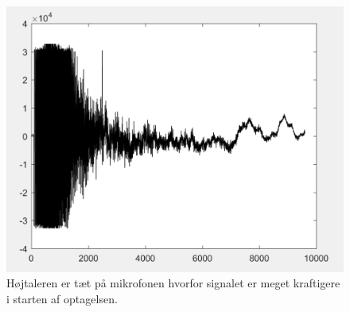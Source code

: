 \documentclass[danish]{article}
\begin{document}
\begin{figure}[H]
	\centering
	\includegraphics[width=0.54\linewidth]{graphics/case4_opg3}
	\caption{Højtaleren er tæt på mikrofonen hvorfor signalet er meget kraftigere i starten af optagelsen.}
	\label{fig:case4_opg3}
\end{figure}
\end{document}
